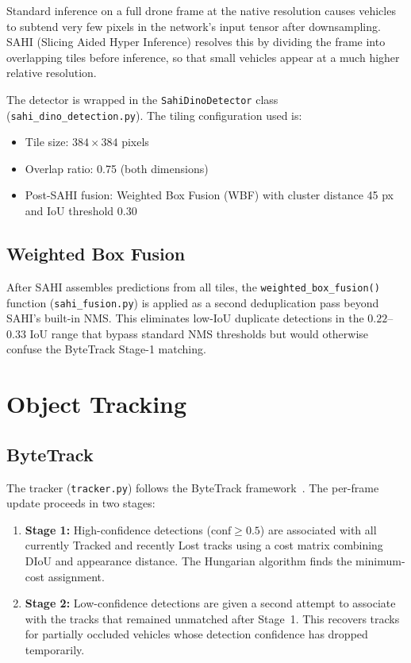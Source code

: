 Standard inference on a full drone frame at the native resolution causes vehicles to
subtend very few pixels in the network's input tensor after downsampling.  SAHI (Slicing
Aided Hyper Inference) resolves this by dividing the frame into overlapping tiles before
inference, so that small vehicles appear at a much higher relative resolution.

The detector is wrapped in the \texttt{SahiDinoDetector} class
(\texttt{sahi\_dino\_detection.py}).  The tiling configuration used is:
\begin{itemize}
    \item Tile size: $384 \times 384$ pixels
    \item Overlap ratio: 0.75 (both dimensions)
    \item Post-SAHI fusion: Weighted Box Fusion (WBF) with cluster distance 45 px and
          IoU threshold 0.30
\end{itemize}

\subsection{Weighted Box Fusion}

After SAHI assembles predictions from all tiles, the \texttt{weighted\_box\_fusion()}
function (\texttt{sahi\_fusion.py}) is applied as a second deduplication pass beyond
SAHI's built-in NMS.  This eliminates low-IoU duplicate detections in the
$0.22$--$0.33$ IoU range that bypass standard NMS thresholds but would otherwise confuse
the ByteTrack Stage-1 matching.

\section{Object Tracking}

\subsection{ByteTrack}

The tracker (\texttt{tracker.py}) follows the ByteTrack framework~\cite{bytetrack}.
The per-frame update proceeds in two stages:

\begin{enumerate}
    \item \textbf{Stage 1:}
          High-confidence detections ($\text{conf} \geq 0.5$) are associated with all
          currently Tracked and recently Lost tracks using a cost matrix combining DIoU
          and appearance distance.  The Hungarian algorithm finds the minimum-cost
          assignment.

    \item \textbf{Stage 2:}
          Low-confidence detections are given a second attempt to associate with the tracks
          that remained unmatched after Stage~1.  This recovers tracks for partially occluded
          vehicles whose detection confidence has dropped temporarily.
\end{enumerate}

